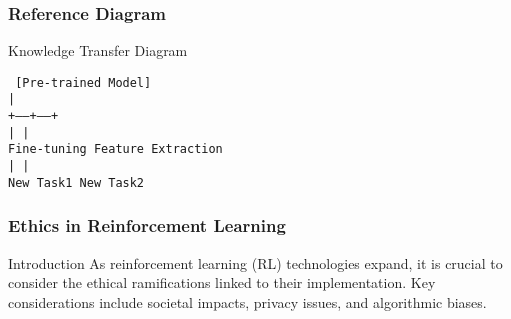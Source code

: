 \documentclass[aspectratio=169]{beamer}
\begin{document}
\begin{frame}[fragile]
  \frametitle{Reference Diagram}
  
  \begin{block}{Knowledge Transfer Diagram}
    \begin{center}
      \texttt{
      [Pre-trained Model] \\
              | \\
        +-----+-----+ \\
        |           | \\
      Fine-tuning Feature Extraction \\
        |           | \\
      New Task1  New Task2
      }
    \end{center}
  \end{block}
\end{frame}

\begin{frame}[fragile]
    \frametitle{Ethics in Reinforcement Learning}
    \begin{block}{Introduction}
        As reinforcement learning (RL) technologies expand, it is crucial to consider the ethical ramifications linked to their implementation. Key considerations include societal impacts, privacy issues, and algorithmic biases.
    \end{block}
\end{frame}
\end{document}
